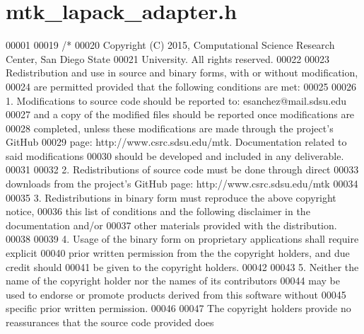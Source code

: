 \hypertarget{mtk__lapack__adapter_8h_source}{\section{mtk\+\_\+lapack\+\_\+adapter.\+h}
\label{mtk__lapack__adapter_8h_source}
}

\begin{DoxyCode}
00001 
00019 \textcolor{comment}{/*}
00020 \textcolor{comment}{Copyright (C) 2015, Computational Science Research Center, San Diego State}
00021 \textcolor{comment}{University. All rights reserved.}
00022 \textcolor{comment}{}
00023 \textcolor{comment}{Redistribution and use in source and binary forms, with or without modification,}
00024 \textcolor{comment}{are permitted provided that the following conditions are met:}
00025 \textcolor{comment}{}
00026 \textcolor{comment}{1. Modifications to source code should be reported to: esanchez@mail.sdsu.edu}
00027 \textcolor{comment}{and a copy of the modified files should be reported once modifications are}
00028 \textcolor{comment}{completed, unless these modifications are made through the project's GitHub}
00029 \textcolor{comment}{page: http://www.csrc.sdsu.edu/mtk. Documentation related to said modifications}
00030 \textcolor{comment}{should be developed and included in any deliverable.}
00031 \textcolor{comment}{}
00032 \textcolor{comment}{2. Redistributions of source code must be done through direct}
00033 \textcolor{comment}{downloads from the project's GitHub page: http://www.csrc.sdsu.edu/mtk}
00034 \textcolor{comment}{}
00035 \textcolor{comment}{3. Redistributions in binary form must reproduce the above copyright notice,}
00036 \textcolor{comment}{this list of conditions and the following disclaimer in the documentation and/or}
00037 \textcolor{comment}{other materials provided with the distribution.}
00038 \textcolor{comment}{}
00039 \textcolor{comment}{4. Usage of the binary form on proprietary applications shall require explicit}
00040 \textcolor{comment}{prior written permission from the the copyright holders, and due credit should}
00041 \textcolor{comment}{be given to the copyright holders.}
00042 \textcolor{comment}{}
00043 \textcolor{comment}{5. Neither the name of the copyright holder nor the names of its contributors}
00044 \textcolor{comment}{may be used to endorse or promote products derived from this software without}
00045 \textcolor{comment}{specific prior written permission.}
00046 \textcolor{comment}{}
00047 \textcolor{comment}{The copyright holders provide no reassurances that the source code provided does}

\end{DoxyCode}

